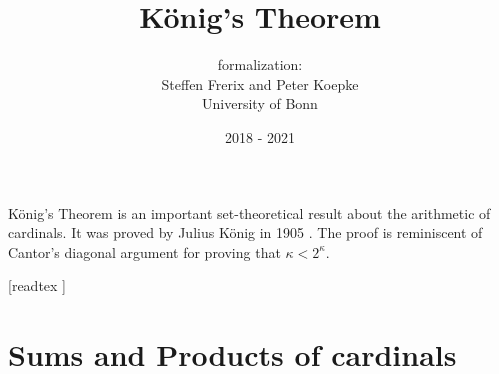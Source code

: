 \documentclass{article}
\title{König's Theorem}
\author{\Naproche formalization:\\[0.5em]
Steffen Frerix and Peter Koepke \\
University of Bonn}
\date{2018 - 2021}
\begin{document}
\maketitle

\noindent König's Theorem is an important set-theoretical result about the
arithmetic of cardinals.
It was proved by Julius König in 1905 \cite[p. 177--180]{Koenig1905}.
The proof is reminiscent of Cantor's diagonal argument for proving that
$\kappa < 2^\kappa$.

\begin{imports}
  \begin{forthel}
    [readtex ]
  \end{forthel}
\end{imports}


\section*{Sums and Products of cardinals}
\end{document}
